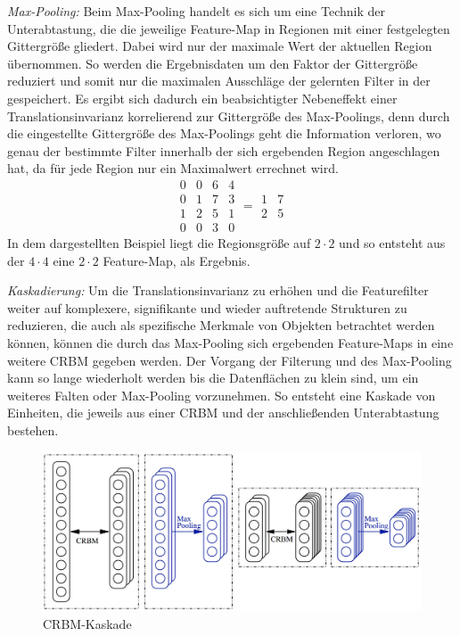 \textit{Max-Pooling:}
Beim Max-Pooling handelt es sich um eine Technik der Unterabtastung, die die jeweilige Feature-Map in Regionen mit einer festgelegten Gittergröße gliedert. 
Dabei wird nur der maximale Wert der aktuellen Region übernommen.
So werden die Ergebnisdaten um den Faktor der Gittergröße reduziert und somit nur die maximalen Ausschläge der gelernten Filter in der gespeichert.
Es ergibt sich dadurch ein beabsichtigter Nebeneffekt einer Translationsinvarianz korrelierend zur Gittergröße des Max-Poolings, denn durch die eingestellte Gittergröße des Max-Poolings geht die Information verloren, wo genau der bestimmte Filter innerhalb der sich ergebenden Region angeschlagen hat, da für jede Region nur ein Maximalwert errechnet wird.\newline
\begin{equation*}
\begin{matrix}
 0 & 0 & 6 & 4 \\
 0 & 1 & 7 & 3 \\
 1 & 2 & 5 & 1 \\
 0 & 0 & 3 & 0
\end{matrix} =
\begin{matrix}
 1 & 7 \\
 2 & 5  
\end{matrix}
\end{equation*}
In dem dargestellten Beispiel liegt die Regionsgröße auf $2 \cdot 2$ und so entsteht aus der $4 \cdot 4$ eine $2 \cdot 2$ Feature-Map, als Ergebnis.  


\textit{Kaskadierung:}
Um die Translationsinvarianz zu erhöhen und die Featurefilter weiter auf komplexere, signifikante und wieder auftretende Strukturen zu reduzieren, die auch als spezifische Merkmale von Objekten betrachtet werden können, können die durch das Max-Pooling sich ergebenden Feature-Maps in eine weitere CRBM gegeben werden. 
Der Vorgang der Filterung und des Max-Pooling kann so lange wiederholt werden bis die Datenflächen zu klein sind, um ein weiteres Falten oder Max-Pooling vorzunehmen.
So entsteht eine Kaskade von Einheiten, die jeweils aus einer CRBM und der anschließenden Unterabtastung bestehen.\newline
\begin{figure}[]
                \centering
                \includegraphics[width=2.0\columnwidth]{images/stack.jpg}
                \caption{CRBM-Kaskade \cite{Norouzi09}}
                \label{cascade}
\end{figure}
